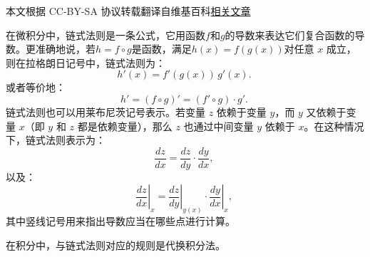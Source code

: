 
本文根据 CC-BY-SA 协议转载翻译自维基百科\href{https://en.wikipedia.org/wiki/Chain_rule}{相关文章}

在微积分中，链式法则是一条公式，它用函数$f$和$g$的导数来表达它们复合函数的导数。更准确地说，若$h = f \circ g$是函数，满足$h(x) = f(g(x))$对任意 $x$ 成立，则在拉格朗日记号中，链式法则为：
$$
h'(x) = f'(g(x)) \, g'(x).~
$$
或者等价地：
$$
h' = (f \circ g)' = (f' \circ g)\cdot g'.~
$$
链式法则也可以用莱布尼茨记号表示。若变量 $z$ 依赖于变量 $y$，而 $y$ 又依赖于变量 $x$（即 $y$ 和 $z$ 都是依赖变量），那么 $z$ 也通过中间变量 $y$ 依赖于 $x$。在这种情况下，链式法则表示为：
$$
\frac{dz}{dx} = \frac{dz}{dy} \cdot \frac{dy}{dx},~
$$
以及：
$$
\left.\frac{dz}{dx}\right|_{x} = \left.\frac{dz}{dy}\right|_{y(x)} \cdot \left.\frac{dy}{dx}\right|_{x},~
$$
其中竖线记号用来指出导数应当在哪些点进行计算。

在积分中，与链式法则对应的规则是代换积分法。

